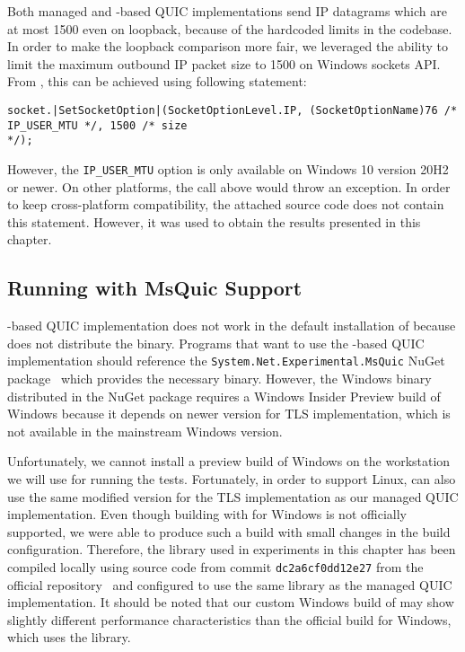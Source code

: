 Both managed and \libmsquic{}-based QUIC implementations send IP datagrams which are at most
\SI{1500}{\byte} even on loopback, because of the hardcoded limits in the codebase. In order to make
the loopback comparison more fair, we leveraged the ability to limit the maximum outbound IP packet
size to \SI{1500}{\byte} on Windows sockets API\@. From \csharp{}, this can be achieved using
following statement:

\begin{lstlisting}[numbers=none,enums={SocketOptionLevel,SocketOptionName}]
socket.|SetSocketOption|(SocketOptionLevel.IP, (SocketOptionName)76 /* IP_USER_MTU */, 1500 /* size
*/);
\end{lstlisting}

However, the \texttt{IP_USER_MTU} option is only available on Windows 10 version 20H2 or newer. On
other platforms, the  call above would throw an exception. In order to keep
cross-platform compatibility, the attached source code does not contain this statement. However, it
was used to obtain the results presented in this chapter.

\subsection{Running with MsQuic Support}

\libmsquic{}-based QUIC implementation does not work in the default installation of \dotnet{}
because \dotnet{} does not distribute the \libmsquic{} binary. Programs that want to use the
\libmsquic{}-based QUIC implementation should reference the
\texttt{System.Net\allowbreak{}.Experimental.MsQuic} NuGet
package~\cite{SystemNetQuicExperimentalMsquic} which provides the necessary \libmsquic{} binary.
However, the Windows \libmsquic{} binary distributed in the NuGet package requires a Windows Insider
Preview build of Windows because it depends on newer \libschannel{} version for TLS implementation,
which is not available in the mainstream Windows version.

Unfortunately, we cannot install a preview build of Windows on the workstation we will use for
running the tests. Fortunately, in order to support Linux, \libmsquic{} can also use the same
modified \libopenssl{} version for the TLS implementation as our managed QUIC implementation. Even
though building \libmsquic{} with \libopenssl{} for Windows is not officially supported, we were
able to produce such a build with small changes in the \libmsquic{} build configuration. Therefore,
the \libmsquic{} library used in experiments in this chapter has been compiled locally using source
code from commit \texttt{dc2a6cf0dd12e27} from the official \libmsquic{}
repository~\cite{msquicGithub} and configured to use the same \libopenssl{} library as the managed
QUIC implementation. It should be noted that our custom Windows build of \libmsquic{} may show
slightly different performance characteristics than the official build for Windows, which uses the
\libschannel{} library.

